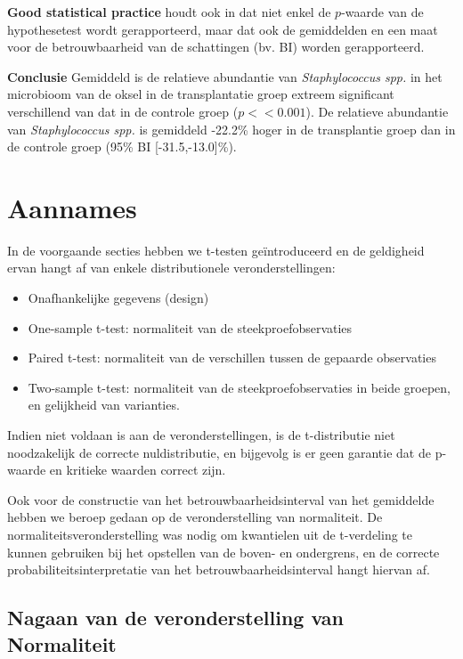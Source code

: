 \documentclass[
  12pt,dutch,coursenotes]{book}
\providecommand{\tightlist}{%
  \setlength{\itemsep}{0pt}\setlength{\parskip}{0pt}}
\begin{document}
\textbf{Good statistical practice} houdt ook in dat niet enkel de \(p\)-waarde van de hypothesetest wordt gerapporteerd, maar dat ook de gemiddelden en een maat voor de betrouwbaarheid van de schattingen (bv. BI) worden gerapporteerd.

\textbf{Conclusie}
Gemiddeld is de relatieve abundantie van \emph{Staphylococcus spp.} in het microbioom van de oksel in de transplantatie groep extreem significant verschillend van dat in de controle groep (\(p<<0.001\)). De relatieve abundantie van \emph{Staphylococcus spp.} is gemiddeld -22.2\% hoger in de transplantie groep dan in de controle groep (95\% BI {[}-31.5,-13.0{]}\%).

\hypertarget{aannames}{%
\section{Aannames}\label{aannames}}

In de voorgaande secties hebben we t-testen geïntroduceerd en de geldigheid ervan hangt af van enkele distributionele veronderstellingen:

\begin{itemize}
\tightlist
\item
  Onafhankelijke gegevens (design)
\item
  One-sample t-test: normaliteit van de steekproefobservaties
\item
  Paired t-test: normaliteit van de verschillen tussen de gepaarde observaties
\item
  Two-sample t-test: normaliteit van de steekproefobservaties in beide groepen, en gelijkheid van varianties.
\end{itemize}

Indien niet voldaan is aan de veronderstellingen, is de t-distributie niet noodzakelijk de correcte nuldistributie, en bijgevolg is er geen garantie dat de p-waarde en kritieke waarden correct zijn.

Ook voor de constructie van het betrouwbaarheidsinterval van het gemiddelde hebben we beroep gedaan op de veronderstelling van normaliteit. De normaliteitsveronderstelling was nodig om kwantielen uit de t-verdeling te kunnen gebruiken bij het opstellen van de boven- en ondergrens, en de correcte probabiliteitsinterpretatie van het betrouwbaarheidsinterval hangt hiervan af.

\hypertarget{nagaan-van-de-veronderstelling-van-normaliteit}{%
\subsection{Nagaan van de veronderstelling van Normaliteit}\label{nagaan-van-de-veronderstelling-van-normaliteit}}
\end{document}

